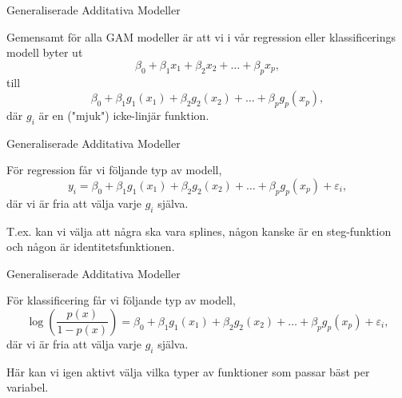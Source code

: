 \documentclass[10pt,english]{beamer}
\begin{document}
\begin{frame}{Generaliserade Additativa Modeller}
    
    Gemensamt för alla GAM modeller är att vi i vår regression eller klassificerings modell byter ut
    \begin{equation*}
        \beta_0 + \beta_1 x_1 + \beta_2 x_2 + \ldots + \beta_p x_p,
    \end{equation*}
    till
    \begin{equation*}
        \beta_0 + \beta_1 g_1(x_1) + \beta_2 g_2(x_2) + \ldots + \beta_p g_p(x_p),
    \end{equation*}
    där $g_i$ är en ("mjuk") icke-linjär funktion.

\end{frame}

\begin{frame}{Generaliserade Additativa Modeller}
    
    För regression får vi följande typ av modell,
    \begin{equation*}
        y_i = \beta_0 + \beta_1 g_1(x_1) + \beta_2 g_2(x_2) + \ldots + \beta_p g_p(x_p) + \varepsilon_i,
    \end{equation*}
    där vi är fria att välja varje $g_i$ själva.

    T.ex. kan vi välja att några ska vara splines, någon kanske är en steg-funktion och någon är identitetsfunktionen.

\end{frame}

\begin{frame}{Generaliserade Additativa Modeller}
    
    För klassificering får vi följande typ av modell,
    \begin{equation*}
        \log\left(\frac{p(x)}{1 - p(x)}\right) = \beta_0 + \beta_1 g_1(x_1) + \beta_2 g_2(x_2) + \ldots + \beta_p g_p(x_p) + \varepsilon_i,
    \end{equation*}
    där vi är fria att välja varje $g_i$ själva.

    Här kan vi igen aktivt välja vilka typer av funktioner som passar bäst per variabel.

\end{frame}
\end{document}
